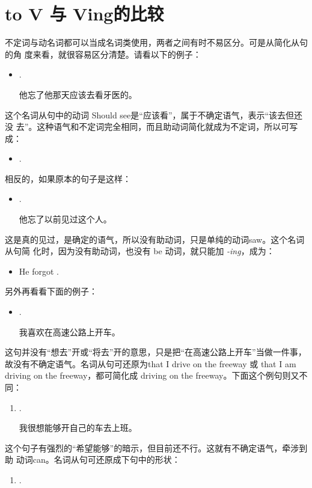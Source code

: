 \section{to V 与 Ving的比较}

不定词与动名词都可以当成名词类使用，两者之间有时不易区分。可是从简化从句的角
度来看，就很容易区分清楚。请看以下的例子：
\begin{itemize}
\item {}  .

  他忘了他那天应该去看牙医的。
\end{itemize}
这个名词从句中的动词 Should see是“应该看”，属于不确定语气，表示“该去但还没
去”。这种语气和不定词完全相同，而且助动词简化就成为不定词，所以可写成：
\begin{itemize}
\item {}  .
\end{itemize}
相反的，如果原本的句子是这样：
\begin{itemize}
\item {}  .

  他忘了以前见过这个人。
\end{itemize}
这是真的见过，是确定的语气，所以没有助动词，只是单纯的动词saw。这个名词从句简
化时，因为没有助动词，也没有 be 动词，就只能加 \emph{-ing}，成为：
\begin{itemize}
\item He forgot .
\end{itemize}

另外再看看下面的例子：
\begin{itemize}
\item {}  .

  我喜欢在高速公路上开车。
\end{itemize}
这句并没有“想去”开或“将去”开的意思，只是把“在高速公路上开车”当做一件事，
故没有不确定语气。名词从句可还原为that I drive on the freeway 或 that I am
driving on the freeway，都可简化成 driving on the freeway。下面这个例句则又不
同：
\begin{enumerate}
\item {}  .

  我很想能够开自己的车去上班。
\end{enumerate}
这个句子有强烈的“希望能够”的暗示，但目前还不行。这就有不确定语气，牵涉到助
动词can。名词从句可还原成下句中的形状：
\begin{enumerate}[resume]
\item {}  .
\end{enumerate}

